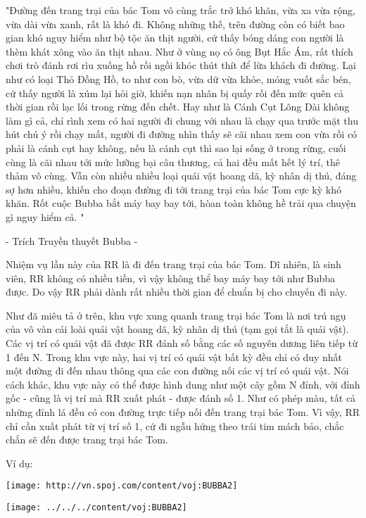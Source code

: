 

"Đường đến trang trại của bác Tom vô cùng trắc trở khó khăn, vừa xa vừa rộng, vừa dài vừa xanh, rất là khó đi. Không những thế, trên đường còn có biết bao gian khó nguy hiểm như bộ tộc ăn thịt người, cứ thấy bóng dáng con người là thèm khát xông vào ăn thịt nhau. Như ở vùng nọ có ông Bụt Hắc Ám, rất thích chơi trò đánh rơi rìu xuống hồ rồi ngồi khóc thút thít để lừa khách đi đường. Lại như có loại Thỏ Đồng Hồ, to như con bò, vừa dữ vừa khỏe, móng vuốt sắc bén, cứ thấy người là xúm lại hỏi giờ, khiến nạn nhân bị quấy rối đến mức quên cả thời gian rồi lạc lối trong rừng đến chết. Hay như là Cánh Cụt Lông Dài không làm gì cả, chỉ rình xem có hai người đi chung với nhau là chạy qua trước mặt thu hút chú ý rồi chạy mất, người đi đường nhìn thấy sẽ cãi nhau xem con vừa rồi có phải là cánh cụt hay không, nếu là cánh cụt thì sao lại sống ở trong rừng, cuối cùng là cãi nhau tới mức lưỡng bại câu thương, cả hai đều mất hết lý trí, thê thảm vô cùng. Vẫn còn nhiều nhiều loại quái vật hoang dã, kỳ nhân dị thú, đáng sợ hơn nhiều, khiến cho đoạn đường đi tới trang trại của bác Tom cực kỳ khó khăn. Rốt cuộc Bubba bắt máy bay bay tới, hòan toàn không hề trải qua chuyện gì nguy hiểm cả. "

- Trích Truyền thuyết Bubba -

Nhiệm vụ lần này của RR là đi đến trang trại của bác Tom. Dĩ nhiên, là sinh viên, RR không có nhiều tiền, vì vậy không thể bay máy bay tới như Bubba được. Do vậy RR phải dành rất nhiều thời gian để chuẩn bị cho chuyến đi này.

Như đã miêu tả ở trên, khu vực xung quanh trang trại bác Tom là nơi trú ngụ của vô vàn cái loài quái vật hoang dã, kỳ nhân dị thú (tạm gọi tắt là quái vật). Các vị trí có quái vật đã được RR đánh số bằng các số nguyên dương liên tiếp từ 1 đến N. Trong khu vực này, hai vị trí có quái vật bất kỳ đều chỉ có duy nhất một đường đi đến nhau thông qua các con đường nối các vị trí có quái vật. Nói cách khác, khu vực này có thể được hình dung như một cây gồm N đỉnh, với đỉnh gốc - cũng là vị trí mà RR xuất phát - được đánh số 1. Như có phép màu, tất cả những đỉnh lá đều có con đường trực tiếp nối đến trang trại bác Tom. Vì vậy, RR chỉ cần xuất phát từ vị trí số 1, cứ đi ngẫu hứng theo trái tim mách bảo, chắc chắn sẽ đến được trang trại bác Tom.

Ví dụ:


\texttt{[image: http://vn.spoj.com/content/voj:BUBBA2]}


\texttt{[image: ../../../content/voj:BUBBA2]}

